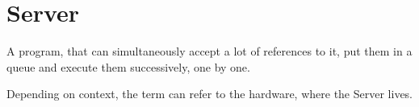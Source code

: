 \section{Server}
\label{sec:Server}

A program, that can simultaneously accept a lot of references to it, put them in a queue and execute them successively, one by one.

Depending on context, the term can refer to the hardware, where the Server lives.
